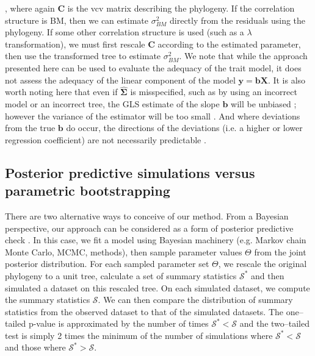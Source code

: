 \documentclass[12pt]{article}
\begin{document}
\citep{Pagel1997, GarlandIves2000}, where again $\mathbf{C}$ is the vcv matrix describing the phylogeny. If the correlation structure is BM, then we can estimate $\sigma^2_{BM}$ directly from the residuals using the phylogeny. If some other correlation structure is used (such as a $\lambda$ transformation), we must first rescale $\mathbf{C}$ according to the estimated parameter, then use the transformed tree to estimate $\sigma^2_{BM}$. We note that while the approach presented here can be used to evaluate the adequacy of the trait model, it does not assess the adequacy of the linear component of the model $\mathbf{y} = \mathbf{b}\mathbf{X}$. It is also worth noting here that even if $\hat{\mathbf{\Sigma}}$ is misspecified, such as by using an incorrect model or an incorrect tree, the GLS estimate of the slope $\mathbf{b}$ will be unbiased \citep{Rao1999}; however the variance of the estimator will be too small \citep{Rohlf2006}. And where deviations from the true $\mathbf{b}$ do occur, the directions of the deviations (i.e. a higher or lower regression coefficient) are not necessarily predictable \citep{Rohlf2006}.

\subsection*{Posterior predictive simulations versus parametric bootstrapping}
There are two alternative ways to conceive of our method. From a Bayesian perspective, our approach can be considered as a form of posterior predictive check \citep{Rubin1984, Gelman1996, Gelman2003}. In this case, we fit a model using Bayesian machinery (e.g. Markov chain Monte Carlo, MCMC, methods), then sample parameter values $\Theta$ from the joint posterior distribution. For each sampled parameter set $\Theta$, we rescale the original phylogeny to a unit tree, calculate a set of summary statistics $\mathcal{S}^*$ and then simulated a dataset on this rescaled tree. On each simulated dataset, we compute the summary statistics $\mathcal{S}$. We can then compare the distribution of summary statistics from the observed dataset to that of the simulated datasets. The one--tailed p-value is approximated by the number of times $\mathcal{S}^* < \mathcal{S}$ and the two--tailed test is simply 2 times the minimum of the number of simulations where $\mathcal{S}^* < \mathcal{S}$ and those where $\mathcal{S}^* > \mathcal{S}$.
\end{document}

